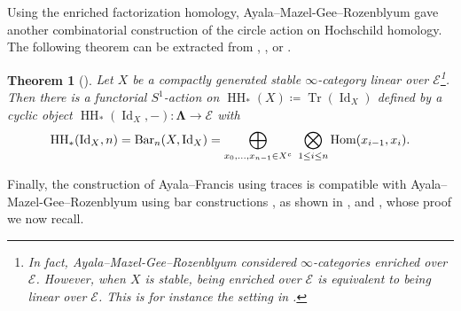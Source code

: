 \documentclass[11pt]{amsart}
\numberwithin{equation}{section}
\theoremstyle{plain}
\newtheorem{Thm}{Theorem}[section]
\theoremstyle{definition}
\theoremstyle{remark}
\newcommand{\cE} { {\mathcal{E}}}
\newcommand{\HOM}{{ \textnormal{Hom}  }}
\newcommand{\Id}{{\operatorname{Id}}}
\newcommand\HH{\operatorname{HH}}
\newcommand\Tr{\operatorname{Tr}}
\begin{document}
Using the enriched factorization homology, Ayala--Mazel-Gee--Rozenblyum gave another combinatorial construction of the circle action on Hochschild homology. The following theorem can be extracted from \cite{Hoyois}, \cite[Definition III.2.3]{Nikolaus-Scholze-Ontopologicalcyclichomology}, or \cite[Definition 3.12, Remark 1.21 \& Remark 2.26]{AMGR-FH-enriched}.

\begin{Thm}[\cite{Nikolaus-Scholze-Ontopologicalcyclichomology,AMGR-FH-enriched}]\label{thm:AMGR}
    Let $X$ be a compactly generated stable $\infty$-category linear over $\cE$\footnote{In fact, Ayala--Mazel-Gee--Rozenblyum \cite{AMGR-FH-enriched} considered $\infty$-categories enriched over $\cE$. However, when $X$ is stable, being enriched over $\cE$ is equivalent to being linear over $\cE$. This is for instance the setting in \cite{Hoyois-Scherotzke-Sibilla}.}. Then there is a functorial $S^1$-action on $\HH_*(X) \coloneqq \Tr(\Id_X)$ defined by a cyclic object $\HH_*(\Id_X, -): \boldsymbol{\Lambda} \to \cE$ with
    \begin{align*}
        \HH_*(\Id_X, n) = \mathrm{Bar}_n(X, \Id_X) =\bigoplus_{x_0, \dots, x_{n-1} \in X^c} ~\bigotimes_{1\leq i\leq n} \HOM(x_{i-1}, x_i).
    \end{align*}
\end{Thm}

Finally, the construction of Ayala--Francis using traces \cite{Ayala-Francis-FH-dim1} is compatible with Ayala--Mazel-Gee--Rozenblyum using bar constructions \cite{AMGR-FH-enriched}, as shown in \cite[Proposition 4.24]{Hoyois-Scherotzke-Sibilla}, \cite[Proposition B.12]{Ayala-Francis-FH-dim1} and \cite[Remark 2.3 \& Remark 4.14]{AMGR-FH-enriched}, whose proof we now recall. 
\end{document}
